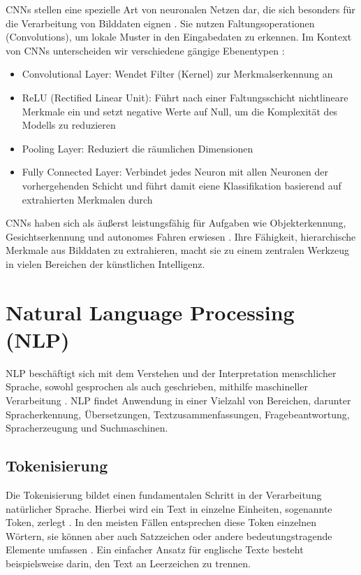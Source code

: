 \glspl{CNN} stellen eine spezielle Art von neuronalen Netzen dar, die sich besonders für die Verarbeitung von Bilddaten eignen \parencite{RebalaGopinath2019AItM}. Sie nutzen Faltungsoperationen (Convolutions), um lokale Muster in den Eingabedaten zu erkennen. Im Kontext von \glspl{CNN} unterscheiden wir verschiedene gängige Ebenentypen \parencite{RebalaGopinath2019AItM}:

\begin{itemize}
	\item Convolutional Layer: Wendet Filter (Kernel) zur Merkmalserkennung an
	\item ReLU (Rectified Linear Unit): Führt nach einer Faltungsschicht nichtlineare Merkmale ein und setzt negative Werte auf Null, um die Komplexität des Modells zu reduzieren
	\item Pooling Layer: Reduziert die räumlichen Dimensionen
	\item Fully Connected Layer: Verbindet jedes Neuron mit allen Neuronen der vorhergehenden Schicht und führt damit eiene Klassifikation basierend auf extrahierten Merkmalen durch
\end{itemize}

CNNs haben sich als äußerst leistungsfähig für Aufgaben wie Objekterkennung, Gesichtserkennung und autonomes Fahren erwiesen \parencite{RebalaGopinath2019AItM}. Ihre Fähigkeit, hierarchische Merkmale aus Bilddaten zu extrahieren, macht sie zu einem zentralen Werkzeug in vielen Bereichen der künstlichen Intelligenz.

\section{Natural Language Processing (NLP)}
\label{sec:nlp}

\gls{NLP} beschäftigt sich mit dem Verstehen und der Interpretation menschlicher Sprache, sowohl gesprochen als auch geschrieben, mithilfe maschineller Verarbeitung \parencite{RebalaGopinath2019AItM}. \gls{NLP} findet Anwendung in einer Vielzahl von Bereichen, darunter Spracherkennung, Übersetzungen, Textzusammenfassungen, Fragebeantwortung, Spracherzeugung und Suchmaschinen.

\subsection{Tokenisierung}
\label{subsec:tokenisierung}

Die Tokenisierung bildet einen fundamentalen Schritt in der Verarbeitung natürlicher Sprache. Hierbei wird ein Text in einzelne Einheiten, sogenannte Token, zerlegt \parencite{RebalaGopinath2019AItM}. In den meisten Fällen entsprechen diese Token einzelnen Wörtern, sie können aber auch Satzzeichen oder andere bedeutungstragende Elemente umfassen \parencite{RebalaGopinath2019AItM}. 
Ein einfacher Ansatz für englische Texte besteht beispielsweise darin, den Text an Leerzeichen zu trennen.

